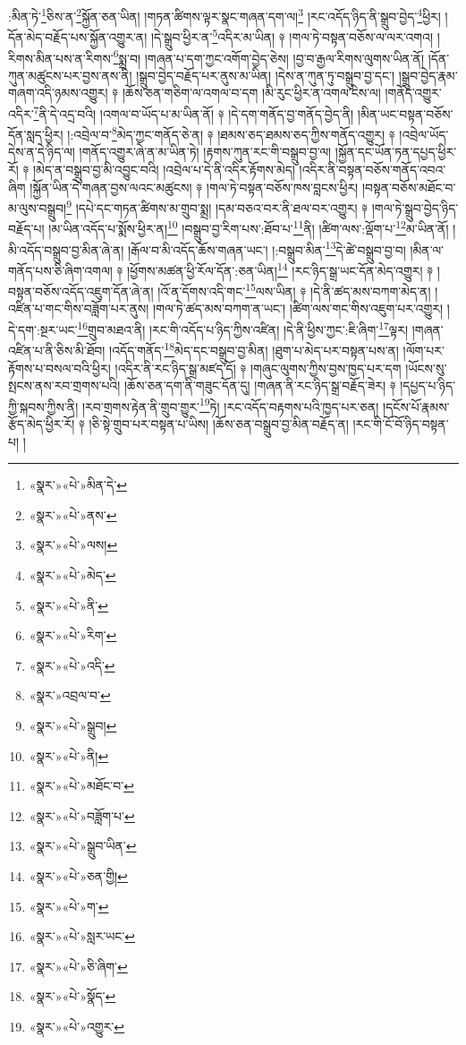 :མིན་ཏེ་\footnote{«སྣར་»«པེ་»མིན་དེ་}ཅིས་ན་\footnote{«སྣར་»«པེ་»ནས་}སྐྱོན་ཅན་ཡིན། །གཏན་ཚིགས་ལྟར་སྣང་གཞན་དག་ལ།\footnote{«སྣར་»«པེ་»ལས།} །རང་འདོད་ཉིད་ནི་སྒྲུབ་བྱེད་\footnote{«སྣར་»«པེ་»མེད་}ཕྱིར། །དོན་མེད་བརྗོད་པས་སྐྱོན་འགྱུར་ན། །དེ་སྒྲུབ་ཕྱིར་ན་\footnote{«སྣར་»«པེ་»ནི་}འདིར་མ་ཡིན། ༈ །གལ་ཏེ་བསྟན་བཅོས་ལ་ལར་འགའ། །རིགས་མིན་པས་ན་རིགས་\footnote{«སྣར་»«པེ་»རིག་}སྨྲ་བ། །གཞན་པ་དག་ཀྱང་འགོག་བྱེད་ཅེས། །བྱ་བ་རྒྱལ་རིགས་ལུགས་ཡིན་ནོ། །དོན་ཀུན་མཚུངས་པར་བྱས་ནས་ནི། །སྒྲུབ་བྱེད་བརྗོད་པར་ནུས་མ་ཡིན། །དེས་ན་ཀུན་ཏུ་བསྒྲུབ་བྱ་དང་། །སྒྲུབ་བྱེད་རྣམ་གཞག་འདི་ཉམས་འགྱུར། ༈ །ཆོས་ཅན་གཅིག་ལ་འགལ་བ་དག །མི་རུང་ཕྱིར་ན་འགལ་ངེས་ལ། །གནོད་འགྱུར་འདིར་\footnote{«སྣར་»«པེ་»འདི་}ནི་དེ་འདྲ་བའི། །འགལ་བ་ཡོད་པ་མ་ཡིན་ནོ། ༈ །དེ་དག་གནོད་བྱ་གནོད་བྱེད་ནི། །མིན་ཡང་བསྟན་བཅོས་དོན་སླད་ཕྱིར། །:འབྲེལ་བ་\footnote{«སྣར་»འབྲལ་བ་}མེད་ཀྱང་གནོད་ཅེ་ན། ༈ །ཐམས་ཅད་ཐམས་ཅད་ཀྱིས་གནོད་འགྱུར། ༈ །འབྲེལ་ཡོད་དེས་ན་དེ་ཉིད་ལ། །གནོད་འགྱུར་ཞེ་ན་མ་ཡིན་ཏེ། །རྟགས་ཀུན་རང་གི་བསྒྲུབ་བྱ་ལ། །སྐྱོན་དང་ཡོན་ཏན་དཔྱད་ཕྱིར་རོ། ༈ །མེད་ན་བསྒྲུབ་བྱ་མི་འབྱུང་བའི། །འབྲེལ་པ་དེ་ནི་འདིར་རྟོགས་མེད། །འདིར་ནི་བསྟན་བཅོས་གནོད་འབའ་ཞིག །སྐྱོན་ཡིན་དེ་གཞན་བྱས་ལའང་མཚུངས། ༈ །གལ་ཏེ་བསྟན་བཅོས་ཁས་བླངས་ཕྱིར། །བསྟན་བཅོས་མཐོང་བ་མ་ལུས་བསྒྲུབ།\footnote{«སྣར་»«པེ་»སྒྲུབ།} །དཔེ་དང་གཏན་ཚིགས་མ་གྲུབ་སྨྲ། །དམ་བཅའ་བར་ནི་ཐལ་བར་འགྱུར། ༈ །གལ་ཏེ་སྒྲུབ་བྱེད་ཉིད་བརྗོད་པ། །མ་ཡིན་འདོད་པ་སྨོས་ཕྱིར་ན།\footnote{«སྣར་»«པེ་»ནི།} །བསྒྲུབ་བྱ་རིག་པས་:ཐོབ་པ་\footnote{«སྣར་»«པེ་»མཐོང་བ་}ནི། །ཚིག་ལས་:ལྡོག་པ་\footnote{«སྣར་»«པེ་»བཟློག་པ་}མ་ཡིན་ནོ། །མི་འདོད་བསྒྲུབ་བྱ་མིན་ཞེ་ན། །རྒོལ་བ་མི་འདོད་ཆོས་གཞན་ཡང་། །:བསྒྲུབ་མིན་\footnote{«སྣར་»«པེ་»སྒྲུབ་ཡིན་}དེ་ཚེ་བསྒྲུབ་བྱ་བ། །མིན་ལ་གནོད་པས་ཅི་ཞིག་འགལ། ༈ །ཕྱོགས་མཚན་ཕྱི་རོལ་དོན་:ཅན་ཡིན།\footnote{«སྣར་»«པེ་»ཅན་གྱི།} །རང་ཉིད་སྒྲ་ཡང་དོན་མེད་འགྱུར། ༈ །བསྟན་བཅོས་འདོད་འཇུག་དོན་ཞེ་ན། །འོ་ན་དོགས་འདི་གང་\footnote{«སྣར་»«པེ་»ག་}ལས་ཡིན། ༈ །དེ་ནི་ཚད་མས་བཀག་མེད་ན། །འཛིན་པ་གང་གིས་བཟློག་པར་ནུས། །གལ་ཏེ་ཚད་མས་བཀག་ན་ཡང་། །ཚིག་ལས་གང་གིས་འཇུག་པར་འགྱུར། །དེ་དག་:སྔར་ཡང་\footnote{«སྣར་»«པེ་»སླར་ཡང་}གྲུབ་མཐའ་ནི། །རང་གི་འདོད་པ་ཉིད་ཀྱིས་འཛིན། །དེ་ནི་ཕྱིས་ཀྱང་:ཇི་ཞིག་\footnote{«སྣར་»«པེ་»ཅི་ཞིག་}ལྟར། །གཞན་འཛིན་པ་ནི་ཅིས་མི་ཐོབ། །འདོད་གནོད་\footnote{«སྣར་»«པེ་»སྣོད་}མེད་དང་བསྒྲུབ་བྱ་མིན། །ཐུག་པ་མེད་པར་བསྟན་པས་ན། །ལོག་པར་རྟོགས་པ་བསལ་བའི་ཕྱིར། །འདིར་ནི་རང་ཉིད་སྒྲ་མཛད་དོ། ༈ །གཞུང་ལུགས་ཀྱིས་བྱས་ཁྱད་པར་དག །ཡོངས་སུ་སྤངས་ནས་རབ་གྲགས་པའི། །ཆོས་ཅན་དག་ནི་གཟུང་དོན་དུ། །གཞན་ནི་རང་ཉིད་སྒྲ་བརྗོད་ཟེར། ༈ །དཔྱད་པ་ཉིད་ཀྱི་སྐབས་ཀྱིས་ནི། །རབ་གྲགས་རྟེན་ནི་གྲུབ་གྱུར་\footnote{«སྣར་»«པེ་»འགྱུར་}ཏེ། །རང་འདོད་བརྟགས་པའི་ཁྱད་པར་ཅན། །དངོས་པོ་རྣམས་རྩོད་མེད་ཕྱིར་རོ། ༈ །ཅི་སྟེ་གྲུབ་པར་བསྟན་པ་ཡིས། །ཆོས་ཅན་བསྒྲུབ་བྱ་མིན་བརྗོད་ན། །རང་གི་ངོ་བོ་ཉིད་བསྟན་པ། །
